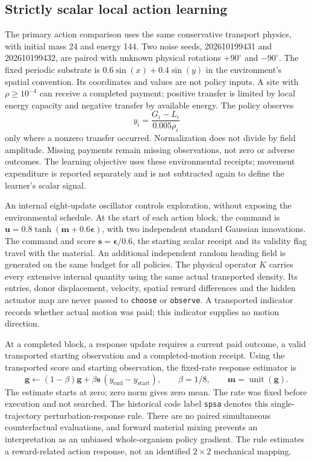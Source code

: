 \subsection*{Strictly scalar local action learning}

The primary action comparison uses the same conservative transport physics, with initial mass 24 and energy 144. Two noise seeds, 202610199431 and 202610199432, are paired with unknown physical rotations $+90^\circ$ and $-90^\circ$. The fixed periodic substrate is $0.6\sin(x)+0.4\sin(y)$ in the environment's spatial convention. Its coordinates and values are not policy inputs. A site with $\rho\geq10^{-4}$ can receive a completed payment; positive transfer is limited by local energy capacity and negative transfer by available energy. The policy observes
\begin{equation}
y_i=\frac{G_i-L_i}{0.005\rho_i}
\end{equation}
only where a nonzero transfer occurred. Normalization does not divide by field amplitude. Missing payments remain missing observations, not zero or adverse outcomes. The learning objective uses these environmental receipts; movement expenditure is reported separately and is not subtracted again to define the learner's scalar signal.

An internal eight-update oscillator controls exploration, without exposing the environmental schedule. At the start of each action block, the command is $\boldsymbol u=0.8\tanh(\boldsymbol m+0.6\boldsymbol\epsilon)$, with two independent standard Gaussian innovations. The command and score $\boldsymbol s=\boldsymbol\epsilon/0.6$, the starting scalar receipt and its validity flag travel with the material. An additional independent random heading field is generated on the same budget for all policies. The physical operator $K$ carries every extensive internal quantity using the same actual transported density. Its entries, donor displacement, velocity, spatial reward differences and the hidden actuator map are never passed to \texttt{choose} or \texttt{observe}. A transported indicator records whether actual motion was paid; this indicator supplies no motion direction.

At a completed block, a response update requires a current paid outcome, a valid transported starting observation and a completed-motion receipt. Using the transported score and starting observation, the fixed-rate response estimator is
\begin{equation}
\boldsymbol g\leftarrow(1-\beta)\boldsymbol g+
\beta\boldsymbol s\,(y_{\mathrm{end}}-y_{\mathrm{start}}),
\qquad \beta=1/8,\qquad \boldsymbol m=\operatorname{unit}(\boldsymbol g).
\end{equation}
The estimate starts at zero; zero norm gives zero mean. The rate was fixed before execution and not searched. The historical code label \texttt{spsa} denotes this single-trajectory perturbation-response rule. There are no paired simultaneous counterfactual evaluations, and forward material mixing prevents an interpretation as an unbiased whole-organism policy gradient. The rule estimates a reward-related action response, not an identified $2\times2$ mechanical mapping.

